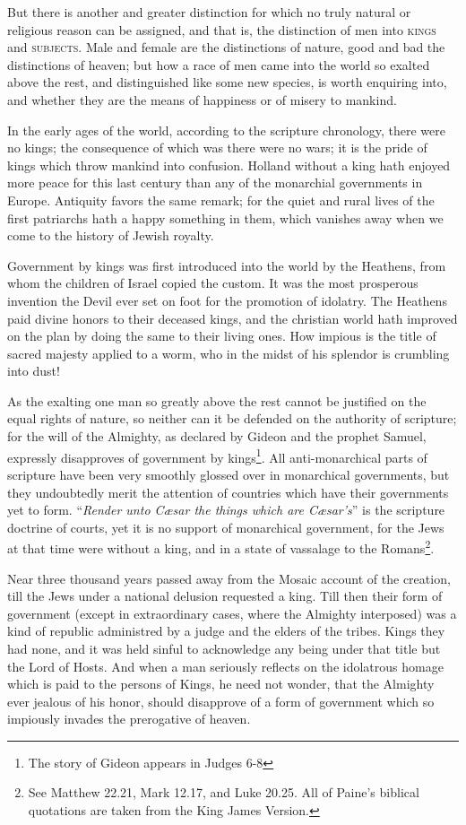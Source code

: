 \documentclass[12pt, twocolumn]{book}
\begin{document}
    But there is another and greater distinction for which no truly natural or religious reason can be assigned, and that is, the distinction of men into \textsc{kings} and \textsc{subjects}. Male and female are the distinctions of nature, good and bad the distinctions of heaven; but how a race of men came into the world so exalted above the rest, and distinguished like some new species, is worth enquiring into, and whether they are the means of happiness or of misery to mankind.

    In the early ages of the world, according to the scripture chronology, there were no kings; the consequence of which was there were no wars; it is the pride of kings which throw mankind into confusion. Holland without a king hath enjoyed more peace for this last century than any of the monarchial governments in Europe. Antiquity favors the same remark; for the quiet and rural lives of the first patriarchs hath a happy something in them, which vanishes away when we come to the history of Jewish royalty.

    Government by kings was first introduced into the world by the Heathens, from whom the children of Israel copied the custom. It was the most prosperous invention the Devil ever set on foot for the promotion of idolatry. The Heathens paid divine honors to their deceased kings, and the christian world hath improved on the plan by doing the same to their living ones. How impious is the title of sacred majesty applied to a worm, who in the midst of his splendor is crumbling into dust!

    As the exalting one man so greatly above the rest cannot be justified on the equal rights of nature, so neither can it be defended on the authority of scripture; for the will of the Almighty, as declared by Gideon and the prophet Samuel, expressly disapproves of government by kings\footnote{The story of Gideon appears in Judges 6-8}. All anti-monarchical parts of scripture have been very smoothly glossed over in monarchical governments, but they undoubtedly merit the attention of countries which have their governments yet to form. “\textit{Render unto Cæsar the things which are Cæsar’s}” is the scripture doctrine of courts, yet it is no support of monarchical government, for the Jews at that time were without a king, and in a state of vassalage to the Romans\footnote{See Matthew 22.21, Mark 12.17, and Luke 20.25. All of Paine's biblical quotations are taken from the King James Version.}.

    Near three thousand years passed away from the Mosaic account of the creation, till the Jews under a national delusion requested a king. Till then their form of government (except in extraordinary cases, where the Almighty interposed) was a kind of republic administred by a judge and the elders of the tribes. Kings they had none, and it was held sinful to acknowledge any being under that title but the Lord of Hosts. And when a man seriously reflects on the idolatrous homage which is paid to the persons of Kings, he need not wonder, that the Almighty ever jealous of his honor, should disapprove of a form of government which so impiously invades the prerogative of heaven.
\end{document}
